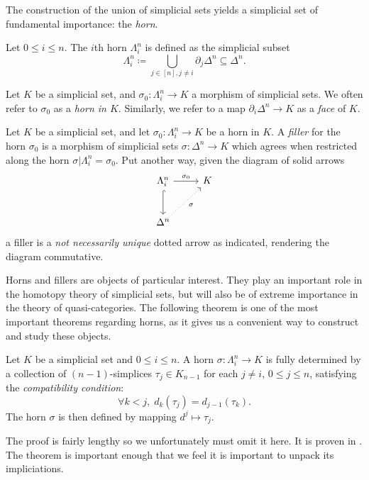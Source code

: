 The construction of the union of simplicial sets yields a simplicial set of fundamental importance: the \emph{horn}.

\begin{definition}\label{4.7}
	Let $0\leq i\leq n$. The $i$th horn $\Lambda _i^n$ is defined as the simplicial subset
	\[
		\Lambda _i^n \coloneqq \bigcup_{j\in[n],j\neq i} \partial _j\Delta ^{n} \subseteq \Delta ^n
	.\]
\end{definition}

\begin{terminology}\label{4.8}
	Let $K$ be a simplicial set, and $\sigma _0 : \Lambda _i^n \to K$ a morphism of simplicial sets. We often refer to $\sigma _0$ as a \emph{horn in $K$}. Similarly, we refer to a map $\partial _i\Delta ^n\to K$ as a \emph{face} of $K$.
\end{terminology}

\begin{definition}\label{4.9}
	Let $K$ be a simplicial set, and let $\sigma _0: \Lambda _i^n \to K$ be a horn in $K$. A \emph{filler} for the horn $\sigma _0$ is a morphism of simplicial sets $\sigma : \Delta ^n \to K$ which agrees when restricted along the horn $\sigma |\Lambda _i^n=\sigma _0$. Put another way, given the diagram of solid arrows
	\[\begin{tikzcd}[row sep = 2.5em, column sep = 2.5em]
	\Lambda _i^n\ar[" \sigma _0 ", r] \ar[hook, d]  & K \\
	\Delta ^n \ar[dotted, " \sigma  "', ur]  & 
	\end{tikzcd}\]
	a filler is a \emph{not necessarily unique} dotted arrow as indicated, rendering the diagram commutative.
\end{definition}

Horns and fillers are objects of particular interest. They play an important role in the homotopy theory of simplicial sets, but will also be of extreme importance in the theory of quasi-categories. The following theorem is one of the most important theorems regarding horns, as it gives us a convenient way to construct and study these objects.

\begin{theorem}\label{4.10}
	Let $K$ be a simplicial set and $0\leq i\leq n$. A horn $\sigma : \Lambda _i^n \to K$ is fully determined by a collection of $(n-1)$-simplices $\tau _j\in K_{n-1} $ for each $j\neq i$, $0\leq j\leq n$, satisfying the \emph{compatibility condition}:
	\[
		\forall k<j,\; d_k(\tau _j)=d_{j-1} (\tau _k)
	.\]
	The horn $\sigma $ is then defined by mapping $d^j\mapsto \tau _j$.
\end{theorem}
The proof is fairly lengthy so we unfortunately must omit it here. It is proven in \cite{gj}. The theorem is important enough that we feel it is important to unpack its impliciations.

